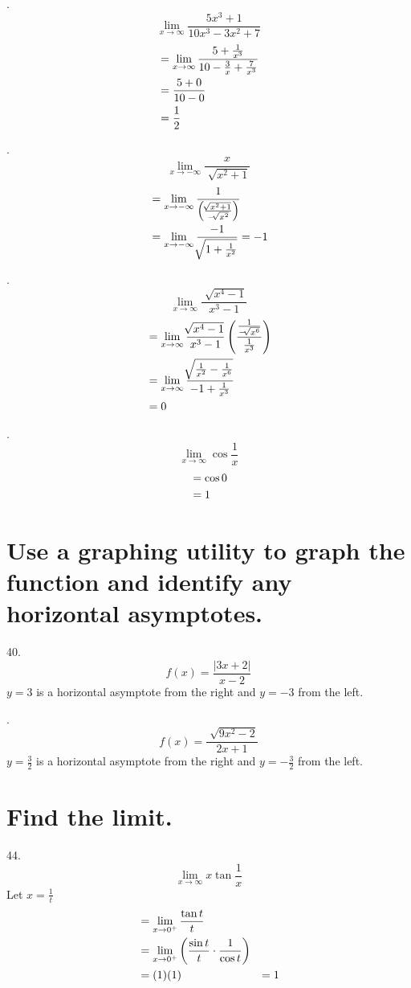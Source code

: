 \documentclass[11pt]{article}
\newcommand*{\vs}{\vspace{1cm}}
\newcommand*{\next}{\noindent}
\newcommand*{\set}{\setcounter{equation}{0}}
\begin{document}
\vs\next
24.\[\lim_{x\to\infty}\frac{5x^3+1}{10x^3-3x^2+7}\]
\begin{align}
    \set
    &=\lim_{x\to\infty}\frac{5+\frac{1}{x^3}}{10-\frac{3}{x}+\frac{7}{x^3}}\\
    &=\frac{5+0}{10-0}\\
    &=\frac{1}{2}
\end{align}

\vs\next
28.\[\lim_{x\to-\infty}\frac{x}{\sqrt[]{x^2+1}}\]
\begin{align}
    \set
    &=\lim_{x\to-\infty}\frac{1}{\left(\frac{\sqrt[]{x^2+1}}{-\sqrt[]{x^2}}\right)}\\
    &=\lim_{x\to-\infty}\frac{-1}{\sqrt[]{1+\frac{1}{x^2}}}=-1
\end{align}

\vs
\next
32.\[\lim_{x\to\infty}\frac{\sqrt[]{x^4-1}}{x^3-1}\]
\begin{align}
    \set
    &=\lim_{x\to\infty}\frac{\sqrt[]{x^4-1}}{x^3-1}\left(\frac{\frac{1}{-\sqrt[]{x^6}}}{\frac{1}{x^3}}\right)\\
    &=\lim_{x\to\infty}\frac{\sqrt[]{\frac{1}{x^2}-\frac{1}{x^6}}}{-1+\frac{1}{x^3}}\\
    &=0
\end{align}

\vs\next
36.\[\lim_{x\to\infty}\cos\frac{1}{x}\]
\begin{align}
    \set
    &=\cos 0\\
    &=1
\end{align}

\section{Use a graphing utility to graph the function and identify any horizontal asymptotes.}
40.\[f(x)=\frac{|3x+2|}{x-2}\]
$y=3$ is a horizontal asymptote from the right and $y=-3$ from the left.

\vs
\next
42.\[f(x)=\frac{\sqrt[]{9x^2-2}}{2x+1}\]
$y=\frac{3}{2}$ is a horizontal asymptote from the right and $y=-\frac{3}{2}$ from the left.

\section{Find the limit.}
44.\[\lim_{x\to\infty}x\tan\frac{1}{x}\]
Let $x=\frac{1}{t}$
\begin{align}
    \set
    &=\lim_{x\to 0^+}\frac{\tan t}{t}\\
    &=\lim_{x\to 0^+}\left(\frac{\sin t}{t}\cdot\frac{1}{\cos t}\right)\\
    &=(1)(1)
    &=1
\end{align}
\end{document}
